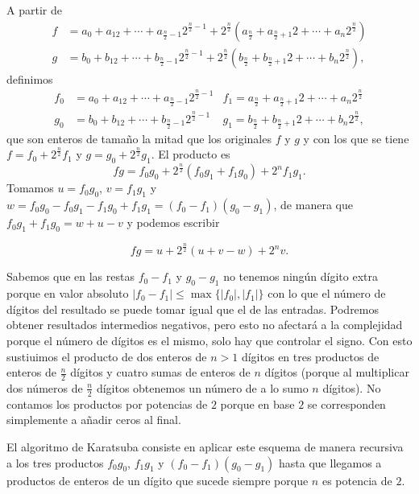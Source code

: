 \documentclass[10pt,a4paper]{article}
\theoremstyle{plain}
\theoremstyle{definition}
\begin{document}
A partir de
\begin{align*}
f &= a_0+a_12+\cdots+a_{\frac{n}{2}-1}2^{\frac{n}{2}-1}+2^{\frac{n}{2}}\left(a_{\frac{n}{2}}+a_{\frac{n}{2}+1}2+\cdots+a_n2^{\frac{n}{2}}\right)\\
g &= b_0+b_12+\cdots+b_{\frac{n}{2}-1}2^{\frac{n}{2}-1}+2^{\frac{n}{2}}\left(b_{\frac{n}{2}}+b_{\frac{n}{2}+1}2+\cdots+b_n2^{\frac{n}{2}}\right),
\end{align*}
definimos 
\begin{align*}
f_0 &=a_0+a_12+\cdots+a_{\frac{n}{2}-1}2^{\frac{n}{2}-1}  &f_1=a_{\frac{n}{2}}+a_{\frac{n}{2}+1}2+\cdots+a_n2^{\frac{n}{2}}\\
g_0 &=b_0+b_12+\cdots+b_{\frac{n}{2}-1}2^{\frac{n}{2}-1}  &g_1=b_{\frac{n}{2}}+b_{\frac{n}{2}+1}2+\cdots+b_n2^{\frac{n}{2}},
\end{align*}
que son enteros de tamaño la mitad que los originales $f$ y $g$ y con los que se tiene $f=f_0+2^\frac{n}{2}f_1$ y $g=g_0+2^\frac{n}{2}g_1$. El producto es
$$fg=f_0g_0+2^\frac{n}{2}(f_0g_1+f_1g_0)+2^nf_1g_1.$$
Tomamos $u=f_0g_0$, $v=f_1g_1$ y $w=f_0g_0-f_0g_1-f_1g_0+f_1g_1=(f_0-f_1)(g_0-g_1)$, de manera que $f_0g_1+f_1g_0=w+u-v$ y podemos escribir

$$fg=u+2^\frac{n}{2}(u+v-w)+2^nv.$$

Sabemos que en las restas $f_0-f_1$ y $g_0-g_1$ no tenemos ningún dígito extra porque en valor absoluto $|f_0-f_1|\leq \max\{|f_0|,|f_1|\}$ con lo que el número de dígitos del resultado se puede tomar igual que el de las entradas. Podremos obtener resultados intermedios negativos, pero esto no afectará a la complejidad porque el número de dígitos es el mismo, solo hay que controlar el signo. Con esto sustiuimos el producto de dos enteros de $n>1$ dígitos en tres productos de enteros de $\frac{n}{2}$ dígitos y cuatro sumas de enteros de $n$ dígitos (porque al multiplicar dos números de $\frac{n}{2}$ dígitos obtenemos un número de a lo sumo $n$ dígitos). No contamos los productos por potencias de $2$ porque en base $2$ se corresponden simplemente a añadir ceros al final.

El algoritmo de Karatsuba consiste en aplicar este esquema de manera recursiva a los tres productos $f_0g_0$, $f_1g_1$ y $(f_0-f_1)(g_0-g_1)$ hasta que llegamos a productos de enteros de un dígito que sucede siempre porque $n$ es potencia de $2$.
\end{document}
